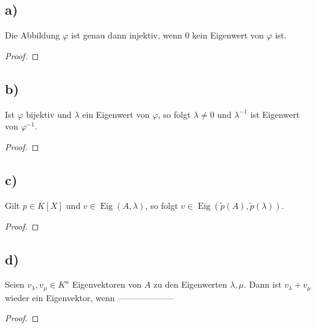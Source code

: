 \documentclass{article}
\DeclareMathOperator{\eigenraum}{Eig}
\begin{document}
\subsection*{a)}

Die Abbildung $\varphi$ ist genau dann injektiv,
wenn $0$ kein Eigenwert von $\varphi$ ist.

\begin{proof}

\end{proof}

\subsection*{b)}

Ist $\varphi$ bijektiv und $\lambda$ ein Eigenwert von $\varphi$,
so folgt
$\lambda \neq 0$
und $\lambda^{-1}$ ist Eigenwert von $\varphi^{-1}$.

\begin{proof}

\end{proof}

\subsection*{c)}

Gilt
$p \in K[X]$
und
$v \in \eigenraum(A, \lambda)$,
so folgt
$v \in \eigenraum(\tilde{p}(A), \tilde{p}(\lambda))$.

\begin{proof}

\end{proof}

\subsection*{d)}

Seien
$v_{\lambda}, v_{\mu} \in K^n$
Eigenvektoren von $A$ zu den Eigenwerten
$\lambda, \mu$.
Dann ist
$v_{\lambda} + v_{\mu}$
wieder ein Eigenvektor,
wenn --------------------

\begin{proof}

\end{proof}
\end{document}
